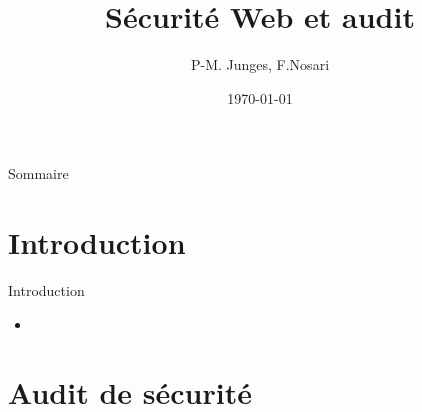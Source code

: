 \documentclass{beamer}
\title{Sécurité Web et audit}
\author{P-M. Junges, F.Nosari}
\institute{Faculté des Sciences et Technologies}
\date{\today}
\begin{document}
\begin{frame}
	\titlepage
\end{frame}

\begin{frame}{Sommaire}
	\tableofcontents
\end{frame}

\section{Introduction}
	\begin{frame}{Introduction}
		\begin{itemize}
			\item %
		\end{itemize}
	\end{frame}

\begin{comment}
	Ca me semble "complet" mais si on doit faire 15 mins de pres
	on risque de prendre pas mal de temps sur cette partie

	I Audit de sécurité
		Definition
			donner def + norme ISO
		Pré requis pour l'audit
			6 principes à respecter
		Preparer l’audit
			expliquer graphique de la page 5 de la norme ISO
		Execution de l’audit
			tests d'intrusion
				def boite blanche, noire, grise
				outils d'intrusion
			test de vulnerabilites
				Outils de tests de vulnerabilites
		Conclure audit
			donner recommendations sur ce qu'il faut changer etc

	En y réfléchissant on aurait moyen de faire notre presentation sur une seule partie
	qui serait donc la partie Audit de sécurité (pour un site web) et ensuite toute la partie
	faille(injection etc.) on en parlerai dans la partie Execution de l'audit.

	Voila, j'attends ton feed back gros !
	
	Réponse :
	
	Je pense que l'on ne peut pas juste faire sur l'audit car il y a l'aspect sécurité web. 
	Ton plan me parrait pas mal, c'est en gros ce que j'ai mis avec plus de détails donc j'aime bien.
	Je me demande ce que l'on va faire exactement comme démo.
	
	On peut essayé de faire un truc complet et on essaie de négocier 10 minutes de plus.
\end{comment}

\section{Audit de sécurité}
\end{document}
